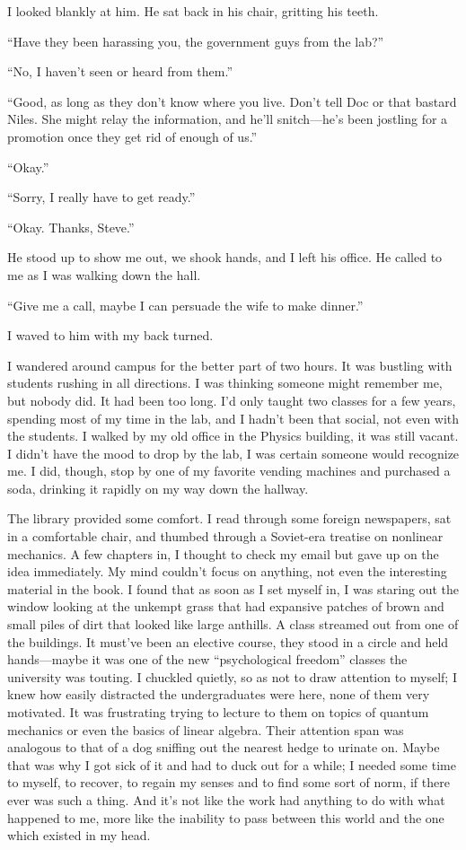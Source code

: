 \documentclass[
]{article}
\begin{document}
I looked blankly at him. He sat back in his chair, gritting his teeth.

``Have they been harassing you, the government guys from the lab?''

``No, I haven't seen or heard from them.''

``Good, as long as they don't know where you live. Don't tell Doc or
that bastard Niles. She might relay the information, and he'll
snitch---he's been jostling for a promotion once they get rid of enough
of us.''

``Okay.''

``Sorry, I really have to get ready.''

``Okay. Thanks, Steve.''

He stood up to show me out, we shook hands, and I left his office. He
called to me as I was walking down the hall.

``Give me a call, maybe I can persuade the wife to make dinner.''

I waved to him with my back turned.

I wandered around campus for the better part of two hours. It was
bustling with students rushing in all directions. I was thinking someone
might remember me, but nobody did. It had been too long. I'd only taught
two classes for a few years, spending most of my time in the lab, and I
hadn't been that social, not even with the students. I walked by my old
office in the Physics building, it was still vacant. I didn't have the
mood to drop by the lab, I was certain someone would recognize me. I
did, though, stop by one of my favorite vending machines and purchased a
soda, drinking it rapidly on my way down the hallway.

The library provided some comfort. I read through some foreign
newspapers, sat in a comfortable chair, and thumbed through a Soviet-era
treatise on nonlinear mechanics. A few chapters in, I thought to check
my email but gave up on the idea immediately. My mind couldn't focus on
anything, not even the interesting material in the book. I found that as
soon as I set myself in, I was staring out the window looking at the
unkempt grass that had expansive patches of brown and small piles of
dirt that looked like large anthills. A class streamed out from one of
the buildings. It must've been an elective course, they stood in a
circle and held hands---maybe it was one of the new ``psychological
freedom'' classes the university was touting. I chuckled quietly, so as
not to draw attention to myself; I knew how easily distracted the
undergraduates were here, none of them very motivated. It was
frustrating trying to lecture to them on topics of quantum mechanics or
even the basics of linear algebra. Their attention span was analogous to
that of a dog sniffing out the nearest hedge to urinate on. Maybe that
was why I got sick of it and had to duck out for a while; I needed some
time to myself, to recover, to regain my senses and to find some sort of
norm, if there ever was such a thing. And it's not like the work had
anything to do with what happened to me, more like the inability to pass
between this world and the one which existed in my head.
\end{document}
